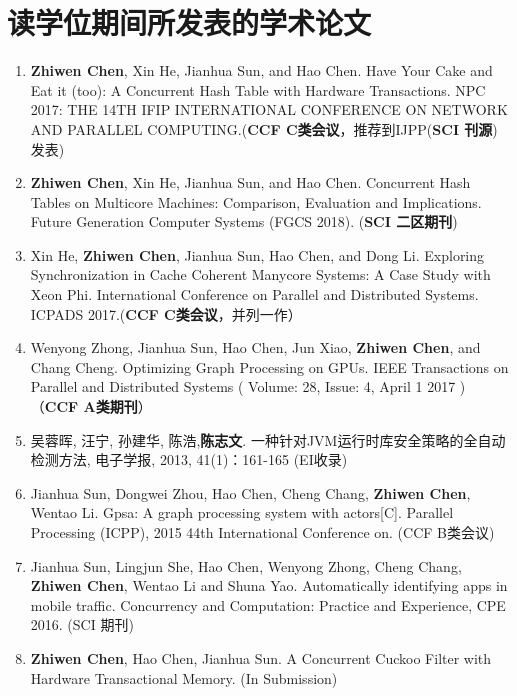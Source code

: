 \chapter{读学位期间所发表的学术论文}

\begin{enumerate}
\item \textbf{Zhiwen Chen}, Xin He, Jianhua Sun, and Hao Chen. Have Your Cake and Eat it (too): A Concurrent Hash Table with Hardware Transactions. NPC 2017: THE 14TH IFIP INTERNATIONAL CONFERENCE ON NETWORK AND PARALLEL COMPUTING.(\textbf{CCF C类会议}，推荐到IJPP(\textbf{SCI 刊源})发表)
\item \textbf{Zhiwen Chen}, Xin He, Jianhua Sun, and Hao Chen. Concurrent Hash Tables on Multicore Machines: Comparison, Evaluation and Implications. Future Generation Computer Systems (FGCS 2018). (\textbf{SCI 二区期刊})
\item Xin He, \textbf{Zhiwen Chen}, Jianhua Sun, Hao Chen, and Dong Li. Exploring Synchronization in Cache Coherent Manycore Systems: A Case Study with Xeon Phi. International Conference on Parallel and Distributed Systems. ICPADS 2017.(\textbf{CCF C类会议}，并列一作）
\item Wenyong Zhong, Jianhua Sun, Hao Chen, Jun Xiao, \textbf{Zhiwen Chen}, and Chang Cheng. Optimizing Graph Processing on GPUs. IEEE Transactions on Parallel and Distributed Systems ( Volume: 28, Issue: 4, April 1 2017 ) （\textbf{CCF A类期刊}）
\item 吴蓉晖, 汪宁, 孙建华, 陈浩,\textbf{陈志文}. 一种针对JVM运行时库安全策略的全自动检测方法, 电子学报, 2013, 41(1)：161-165 (EI收录)
\item Jianhua Sun, Dongwei Zhou, Hao Chen, Cheng Chang, \textbf{Zhiwen Chen}, Wentao Li. Gpsa: A graph processing system with actors[C]. Parallel Processing (ICPP), 2015 44th International Conference on. (CCF B类会议)
 \item Jianhua Sun, Lingjun She, Hao Chen, Wenyong Zhong, Cheng Chang, \textbf{Zhiwen Chen}, Wentao Li and Shuna Yao. Automatically identifying apps in mobile traffic. Concurrency and Computation: Practice and Experience, CPE 2016. (SCI 期刊)
 \item \textbf{Zhiwen Chen}, Hao Chen, Jianhua Sun. A Concurrent Cuckoo Filter with Hardware Transactional Memory. (In Submission)
\end{enumerate}


